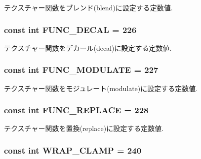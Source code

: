 テクスチャー関数をブレンド(blend)に設定する定数値. \hypertarget{classm3g_1_1Texture2D_235b942b18219513ca4a5a8c1a3171ac}{
\subsubsection[{FUNC\_\-DECAL}]{\setlength{\rightskip}{0pt plus 5cm}const int {\bf FUNC\_\-DECAL} = 226}}
\label{classm3g_1_1Texture2D_235b942b18219513ca4a5a8c1a3171ac}


テクスチャー関数をデカール(decal)に設定する定数値. \hypertarget{classm3g_1_1Texture2D_4482b0d4d6d1f64aaf33c3c5862de30e}{
\subsubsection[{FUNC\_\-MODULATE}]{\setlength{\rightskip}{0pt plus 5cm}const int {\bf FUNC\_\-MODULATE} = 227}}
\label{classm3g_1_1Texture2D_4482b0d4d6d1f64aaf33c3c5862de30e}


テクスチャー関数をモジュレート(modulate)に設定する定数値. \hypertarget{classm3g_1_1Texture2D_14f24332e168c5e210ddad47fb5cdd17}{
\subsubsection[{FUNC\_\-REPLACE}]{\setlength{\rightskip}{0pt plus 5cm}const int {\bf FUNC\_\-REPLACE} = 228}}
\label{classm3g_1_1Texture2D_14f24332e168c5e210ddad47fb5cdd17}


テクスチャー関数を置換(replace)に設定する定数値. \hypertarget{classm3g_1_1Texture2D_e36d8facf5b60eb6c59888121731c438}{
\subsubsection[{WRAP\_\-CLAMP}]{\setlength{\rightskip}{0pt plus 5cm}const int {\bf WRAP\_\-CLAMP} = 240}}
\label{classm3g_1_1Texture2D_e36d8facf5b60eb6c59888121731c438}


